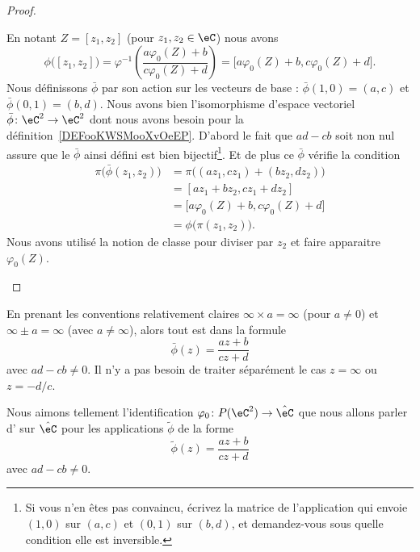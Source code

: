 \begin{proof}
\begin{subproof}
		En notant \( Z=[z_1,z_2]\) (pour \( z_1,z_2\in \eC\)) nous avons
		\begin{equation}
			\phi\big( [z_1,z_2] \big)=\varphi^{-1}\left( \frac{ a\varphi_0(Z)+b }{ c\varphi_0(Z)+d } \right)=\big[ a\varphi_0(Z)+b,c\varphi_0(Z)+d \big].
		\end{equation}
		Nous définissons \( \bar\phi\) par son action sur les vecteurs de base : \( \bar\phi(1,0)=(a,c)\) et \( \bar\phi(0,1)=(b,d)\). Nous avons bien l'isomorphisme d'espace vectoriel \( \bar\phi\colon \eC^2\to \eC^2\) dont nous avons besoin pour la définition~\ref{DEFooKWSMooXvOeEP}. D'abord le fait que \( ad-cb\) soit non nul assure que le \( \bar\phi\) ainsi défini  est bien bijectif\footnote{Si vous n'en êtes pas convaincu, écrivez la matrice de l'application qui envoie \( (1,0)\) sur \( (a,c)\) et \( (0,1)\) sur \( (b,d)\), et demandez-vous sous quelle condition elle est inversible.}. Et de plus ce \( \bar\phi\) vérifie la condition
		\begin{subequations}
			\begin{align}
				\pi\big( \bar\phi(z_1,z_2) \big) & =\pi\big( (az_1,cz_1)+(bz_2,dz_2) \big)      \\
				                                 & =[az_1+bz_2,cz_1+dz_2]                       \\
				                                 & =\big[ a\varphi_0(Z)+b,c\varphi_0(Z)+d \big] \\
				                                 & =\phi\big( \pi(z_1,z_2) \big).
			\end{align}
		\end{subequations}
		Nous avons utilisé la notion de classe pour diviser par \( z_2\) et faire apparaitre \( \varphi_0(Z)\).
	\end{subproof}
\end{proof}

\begin{remark}
	En prenant les conventions relativement claires \( \infty\times a=\infty\) (pour \( a\neq 0\)) et \( \infty\pm a=\infty\) (avec \( a\neq \infty\)), alors tout est dans la formule
	\begin{equation}
		\bar\phi(z)=\frac{ az+b }{ cz+d }
	\end{equation}
	avec \( ad-cb\neq 0\). Il n'y a pas besoin de traiter séparément le cas \( z=\infty\) ou \( z=-d/c\).
\end{remark}


\begin{definition}      \label{DEFooAMQHooPFUgIa}
	Nous aimons tellement l'identification \( \varphi_0\colon P(\eC^2)\to \hat \eC\) que nous allons parler d' sur \( \hat \eC\) pour les applications \( \tilde \phi\) de la forme
	\begin{equation}
		\tilde \phi(z)=\frac{ az+b }{ cz+d }
	\end{equation}
	avec \( ad-cb\neq 0\).
\end{definition}


